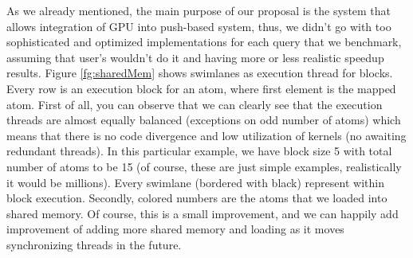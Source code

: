 \documentclass[11pt,a4paper]{report}
\begin{document}
As we already mentioned, the main purpose of our proposal is the system that allows integration of GPU into push-based system, thus, we didn't go with too sophisticated and optimized implementations for each query that we benchmark, assuming that user's wouldn't do it and having more or less realistic speedup results. Figure \ref{fg:sharedMem} shows swimlanes as execution thread for blocks. Every row is an execution block for an atom, where first element is the mapped atom. First of all, you can observe that we can clearly see that the execution threads are almost equally balanced (exceptions on odd number of atoms) which means that there is no code divergence and low utilization of kernels (no awaiting redundant threads). In this particular example, we have block size 5 with total number of atoms to be 15 (of course, these are just simple examples, realistically it would be millions). Every swimlane (bordered with black) represent within block execution. Secondly, colored numbers are the atoms that we loaded into shared memory. Of course, this is a small improvement, and we can happily add improvement of adding more shared memory and loading as it moves synchronizing threads in the future.
\end{document}
